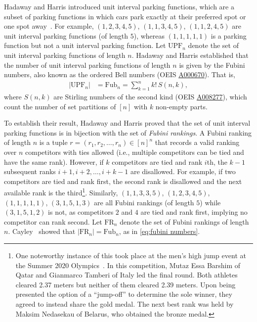 \documentclass[11pt,reqno]{amsart}
\newcommand{\Fub}{\mathrm{Fub}}
\theoremstyle{definition}
\theoremstyle{notation}
\theoremstyle{openproblem}
\newcommand{\upf}[1]{\text{UPF}_{#1}}
\newcommand{\fr}[1]{\text{FR}_{#1}}
\begin{document}
Hadaway and Harris introduced unit interval parking functions, which are a subset of parking functions in which cars park exactly at their preferred spot or one spot away~\cite{Hadaway_unit_interval}. 
For example, $(1, 2, 3, 4, 5)$, $(1, 1, 3, 4, 5)$, $(1, 1, 2, 4, 5)$ are unit interval parking functions (of length $5$), whereas $(1, 1, 1, 1, 1)$ is a parking function but not a unit interval parking function.
Let $\upf{n}$ denote the set of unit interval parking functions of length $n$.
Hadaway and Harris established that the number of unit interval parking functions of length $n$ is given by the Fubini numbers, also known as the ordered Bell numbers (OEIS \href{https://oeis.org/A000670}{A000670}).
That is,
\begin{align}\label{eq:fubini numbers}
 |\upf{n}|
& =
 \Fub_{n}
 =\sum_{k=1}^n k!\, S(n,k),
\end{align}
where $S(n,k)$ are Stirling numbers of the second kind (OEIS \href{https://oeis.org/A008277}{A008277}), which count the number of set partitions of $[n]$ with $k$ non-empty parts.

To establish their result, Hadaway and Harris proved that the set of unit interval parking functions is in bijection with the set of \emph{Fubini rankings}.
A Fubini ranking of length $n$ is a tuple $r=(r_1,r_2,\ldots,r_n)\in [n]^n$ that records a valid ranking over $n$ competitors with ties allowed (i.e., multiple competitors can be tied and have the same rank).
However, if $k$ competitors are tied and rank $i$th, the $k-1$ subsequent ranks $i + 1, i + 2, \ldots, i + k - 1$ are disallowed.
For example, if two competitors are tied and rank first, the second rank is disallowed and the next available rank is the third\footnote{
One noteworthy instance of this took place at the men's high jump event at the Summer 2020 Olympics~\cite{olympics}.
In this competition, Mutaz Essa Barshim of Qatar and Gianmarco Tamberi of Italy led the final round.
Both athletes cleared 2.37 meters but neither of them cleared 2.39 meters.
Upon being presented the option of a ``jump-off'' to determine the sole winner, they agreed to instead share the gold medal. 
The next best rank was held by Maksim Nedasekau of Belarus, who obtained the bronze medal.
}.
Similarly, $(1, 1, 3, 3, 5)$, $(1, 2, 3, 4, 5)$, $(1, 1, 1, 1, 1)$, $(3, 1, 5, 1, 3)$ are all Fubini rankings (of length $5$) while $(3, 1, 5, 1, 2)$ is not, as competitors $2$ and $4$ are tied and rank first, implying no competitor can rank second.
Let $\fr{n}$ denote the set of Fubini rankings of length $n$.
Cayley~\cite{cayley_2009} showed that $|\fr{n}|=\Fub_n$, as in \eqref{eq:fubini numbers}.
\end{document}
